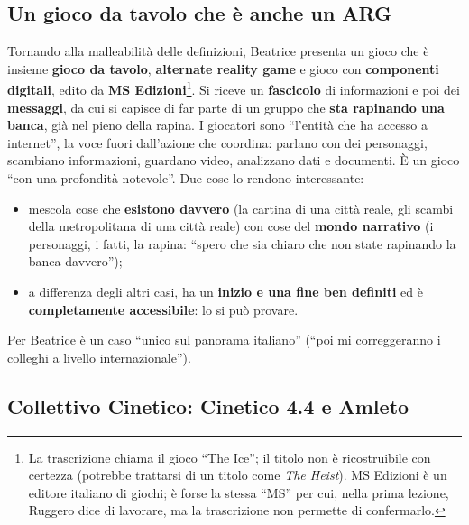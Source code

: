 \subsection{Un gioco da tavolo che è anche un ARG}

Tornando alla malleabilità delle definizioni, Beatrice presenta un gioco che è
insieme \textbf{gioco da tavolo}, \textbf{alternate reality game} e gioco con
\textbf{componenti digitali}, edito da \textbf{MS Edizioni}\footnote{La
trascrizione chiama il gioco ``The Ice''; il titolo non è ricostruibile con
certezza (potrebbe trattarsi di un titolo come \emph{The Heist}). MS Edizioni
è un editore italiano di giochi; è forse la stessa ``MS'' per cui, nella prima
lezione, Ruggero dice di lavorare, ma la trascrizione non permette di
confermarlo.}. Si riceve un \textbf{fascicolo} di informazioni e poi dei
\textbf{messaggi}, da cui si capisce di far parte di un gruppo che \textbf{sta
rapinando una banca}, già nel pieno della rapina. I giocatori sono ``l'entità che
ha accesso a internet'', la voce fuori dall'azione che coordina: parlano con dei
personaggi, scambiano informazioni, guardano video, analizzano dati e
documenti. È un gioco ``con una profondità notevole''. Due cose lo rendono
interessante:
\begin{itemize}
  \item mescola cose che \textbf{esistono davvero} (la cartina di una città
        reale, gli scambi della metropolitana di una città reale) con cose del
        \textbf{mondo narrativo} (i personaggi, i fatti, la rapina: ``spero che
        sia chiaro che non state rapinando la banca davvero'');
  \item a differenza degli altri casi, ha un \textbf{inizio e una fine ben
        definiti} ed è \textbf{completamente accessibile}: lo si può provare.
\end{itemize}
Per Beatrice è un caso ``unico sul panorama italiano'' (``poi mi correggeranno i
colleghi a livello internazionale'').

\subsection{Collettivo Cinetico: Cinetico 4.4 e Amleto}



